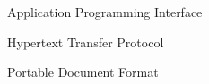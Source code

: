 \UnnumberedChapter{\abbrevname}

\begin{abbreviations}
    \item[API]  Application Programming Interface
    \item[HTTP] Hypertext Transfer Protocol
    \item[PDF]  Portable Document Format
\end{abbreviations}
